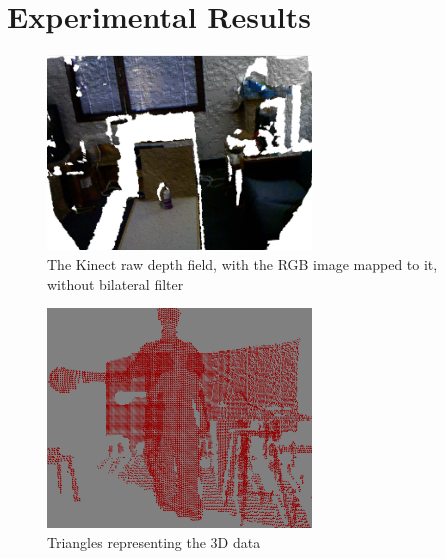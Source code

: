 \documentclass[12pt,twocolumn]{article}
\begin{document}
\section{Experimental Results}

\begin{figure}[H]
\centering
\includegraphics[width=70mm]{kinectwaterbottle.png}
\caption{The Kinect raw depth field, with the RGB image mapped to it, without bilateral filter}
\label{waterbot}
\end{figure}

\begin{figure}[H]
\centering
\includegraphics[width=70mm]{3dtriangles.png}
\caption{Triangles representing the 3D data}
\label{3dtri}
\end{figure}
\end{document}
